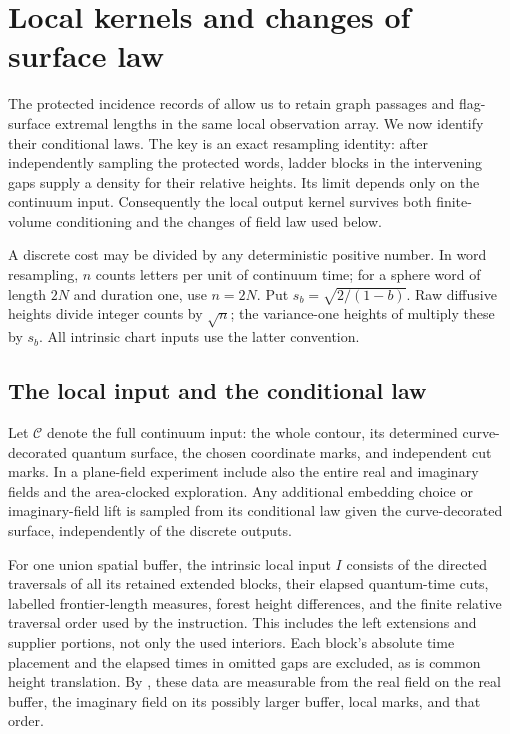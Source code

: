 \section{Local kernels and changes of surface law}\label{ker:section}

The protected incidence records of 
allow us to retain graph passages and flag-surface extremal lengths
in the same local observation array. We now identify their conditional
laws. The key is an exact resampling identity: after independently
sampling the protected words, ladder blocks in the intervening gaps
supply a density for their relative heights. Its limit depends only
on the continuum input. Consequently the local output kernel survives
both finite-volume conditioning and the changes of field law used below.

A discrete cost may be divided by any deterministic positive number.
In word resampling, \(n\) counts letters per unit of continuum time;
for a sphere word of length \(2N\) and duration one, use \(n=2N\).
Put \(s_b=\sqrt{2/(1-b)}\). Raw diffusive heights divide integer counts
by \(\sqrt n\); the variance-one heights of 
multiply these by \(s_b\). All intrinsic chart inputs use the latter
convention.

\subsection{The local input and the conditional law}

Let \(\mathcal C\) denote the full continuum input: the whole contour,
its determined curve-decorated quantum surface, the chosen coordinate
marks, and independent cut marks. In a plane-field experiment include
also the entire real and imaginary fields and the area-clocked
exploration. Any additional embedding choice or imaginary-field lift
is sampled from its conditional law given the curve-decorated surface,
independently of the discrete outputs.

For one union spatial buffer, the intrinsic local input \(I\) consists
of the directed traversals of all its retained extended blocks, their
elapsed quantum-time cuts, labelled frontier-length measures, forest height
differences, and the finite relative traversal order used by the
instruction. This includes the left extensions and supplier portions,
not only the used interiors. Each block's absolute time placement and
the elapsed times in omitted gaps are excluded, as is common height
translation.
By , these data are
measurable from the real field on the real buffer, the imaginary field
on its possibly larger buffer, local marks, and that order.

